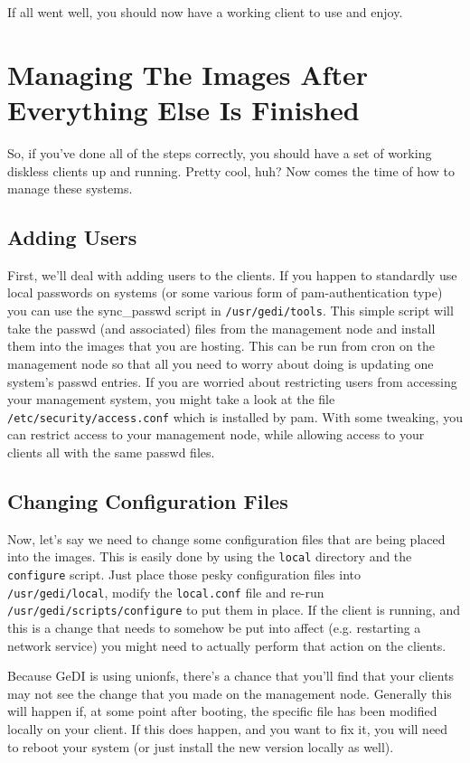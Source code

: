 \documentclass[10pt,a4paper,titlepage]{article}
\begin{document}
If all went well, you should now have a working client to use and enjoy.

\section{Managing The Images After Everything Else Is Finished}
So, if you've done all of the steps correctly, you should have a set of working
diskless clients up and running.  Pretty cool, huh?  Now comes the time of how
to manage these systems.

\subsection{Adding Users}
First, we'll deal with adding users to the clients.  If you happen to standardly
use local passwords on systems (or some various form of pam-authentication type)
you can use the sync\_passwd script in \verb!/usr/gedi/tools!.  This simple
script will take the passwd (and associated) files from the management node and
install them into the images that you are hosting.  This can be run from cron
on the management node so that all you need to worry about doing is updating one
system's passwd entries.  If you are worried about restricting users from
accessing your management system, you might take a look at the file
\verb!/etc/security/access.conf! which is installed by pam.  With some tweaking,
you can restrict access to your management node, while allowing access to your
clients all with the same passwd files.

\subsection{Changing Configuration Files}
Now, let's say we need to change some configuration files that are being placed
into the images.  This is easily done by using the \verb!local! directory and
the \verb!configure! script.  Just place those pesky configuration
files into \verb!/usr/gedi/local!, modify the \verb!local.conf! file and re-run
\verb!/usr/gedi/scripts/configure! to put them in place.  If the client is
running, and this is a change that needs to somehow be put into affect (e.g.
restarting a network service) you might need to actually perform that action on
the clients.

Because GeDI is using unionfs, there's a chance that you'll find that your
clients may not see the change that you made on the management node.  Generally
this will happen if, at some point after booting, the specific file has been
modified locally on your client.  If this does happen, and you want to fix it,
you will need to reboot your system (or just install the new version locally
as well).
\end{document}
